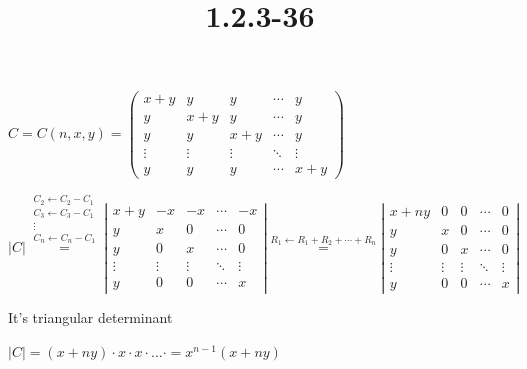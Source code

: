 \documentclass{article}
\title{1.2.3-36}
\begin{document}
\maketitle

\( C = C(n,x,y) = \left(\begin{matrix}x + y & y & y & \cdots & y \\ y & x + y & y & \cdots & y \\ y & y & x + y & \cdots & y \\ \vdots & \vdots & \vdots & \ddots & \vdots \\ y & y & y & \cdots & x + y \end{matrix}\right) \)

\( |C| \overset{\substack{C_2 \leftarrow C_2 - C_1 \\ C_3 \leftarrow C_3 - C_1 \\ \vdots \\ C_n \leftarrow C_n - C_1}}{=}  \left|\begin{matrix}x + y & -x & -x & \cdots & -x \\ y & x & 0 & \cdots & 0 \\ y & 0 & x & \cdots & 0\\ \vdots & \vdots & \vdots & \ddots & \vdots \\ y & 0 & 0 & \cdots & x \end{matrix}\right| \overset{R_1 \leftarrow R_1 + R_2 + \cdots + R_n}{=} \left|\begin{matrix}x + ny & 0 & 0 & \cdots & 0 \\ y & x & 0 & \cdots & 0 \\ y & 0 & x & \cdots & 0\\ \vdots & \vdots & \vdots & \ddots & \vdots \\ y & 0 & 0 & \cdots & x \end{matrix}\right| \)

It's triangular determinant

\( |C| = (x+ny)\cdot x \cdot x \cdot\ldots\cdot = x^{n-1}(x+ny) \)
\end{document}
